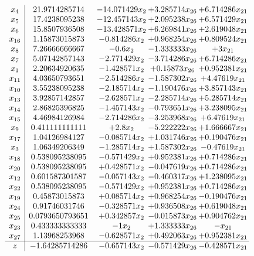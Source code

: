 \documentclass[11pt]{article}
\begin{document}
\[\begin{array}{c| c c@{\hskip 2pt} c@{\hskip 2pt} c@{\hskip 2pt} }
 x_{4}   &  21.9714285714 & -14.071429 x_{2} & + 3.285714 x_{26} & + 6.714286 x_{21}\\
 x_{5}   &  17.4238095238 & -12.457143 x_{2} & + 2.095238 x_{26} & + 6.571429 x_{21}\\
 x_{6}   &  15.8507936508 & -13.428571 x_{2} & + 6.269841 x_{26} & + 2.619048 x_{21}\\
 x_{16}   &  1.15873015873 & -0.814286 x_{2} & + 0.968254 x_{26} & + 0.809524 x_{21}\\
 x_{8}   &  7.26666666667 & -0.6 x_{2} & -1.333333 x_{26} & + 3 x_{21}\\
 x_{7}   &  5.07142857143 & -2.771429 x_{2} & -3.714286 x_{26} & + 6.714286 x_{21}\\
 x_{1}   &  2.20634920635 & -1.428571 x_{2} & + 0.15873 x_{26} & + 0.952381 x_{21}\\
 x_{11}   &  4.03650793651 & -2.514286 x_{2} & -1.587302 x_{26} & + 4.47619 x_{21}\\
 x_{10}   &  3.55238095238 & -2.185714 x_{2} & -1.190476 x_{26} & + 3.857143 x_{21}\\
 x_{13}   &  3.92857142857 & -2.628571 x_{2} & -2.285714 x_{26} & + 5.285714 x_{21}\\
 x_{14}   &  2.86825396825 & -1.457143 x_{2} & -0.793651 x_{26} & + 3.238095 x_{21}\\
 x_{15}   &  4.46984126984 & -2.714286 x_{2} & -3.253968 x_{26} & + 6.47619 x_{21}\\
 x_{9}   &  0.411111111111 & + 2.8 x_{2} & -5.222222 x_{26} & + 1.666667 x_{21}\\
 x_{17}   &  1.04126984127 & -0.085714 x_{2} & + 1.031746 x_{26} & + 0.190476 x_{21}\\
 x_{3}   &  1.06349206349 & -1.285714 x_{2} & + 1.587302 x_{26} & -0.47619 x_{21}\\
 x_{18}   &  0.538095238095 & -0.571429 x_{2} & + 0.952381 x_{26} & + 0.714286 x_{21}\\
 x_{20}   &  0.538095238095 & + 0.428571 x_{2} & -0.047619 x_{26} & + 0.714286 x_{21}\\
 x_{12}   &  0.601587301587 & -0.057143 x_{2} & -0.460317 x_{26} & + 1.238095 x_{21}\\
 x_{22}   &  0.538095238095 & -0.571429 x_{2} & + 0.952381 x_{26} & + 0.714286 x_{21}\\
 x_{19}   &  0.45873015873 & + 0.085714 x_{2} & + 0.968254 x_{26} & -0.190476 x_{21}\\
 x_{24}   &  0.91746031746 & -0.328571 x_{2} & + 0.936508 x_{26} & + 0.619048 x_{21}\\
 x_{25}   &  0.0793650793651 & + 0.342857 x_{2} & -0.015873 x_{26} & + 0.904762 x_{21}\\
 x_{23}   &  0.433333333333 & -1 x_{2} & + 1.333333 x_{26} & - x_{21}\\
 x_{27}   &  1.13968253968 & -0.628571 x_{2} & + 0.492063 x_{26} & + 0.952381 x_{21}\\
\hline
z    &  -1.64285714286 & -0.657143 x_{2} & -0.571429 x_{26} & -0.428571 x_{21}\\
\end{array}\]
\end{document}
